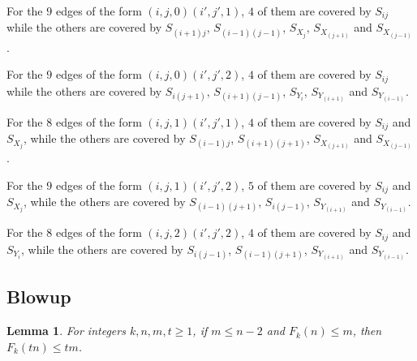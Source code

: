 \documentclass{article}
\newtheorem{lem}[thm]{Lemma}
\begin{document}
For the $9$ edges of the form $(i,j,0)(i',j',1)$, $4$ of them are covered by $S_{{ij}}$ while the others are covered by $S_{{(i+1)j}}$, $S_{{(i-1)(j-1)}}$, $S_{X_j}$, $S_{X_{(j+1)}}$ and $S_{X_{(j-1)}}$.

For the $9$ edges of the form $(i,j,0)(i',j',2)$, $4$ of them are covered by $S_{{ij}}$ while the others are covered by $S_{{i(j+1)}}$, $S_{{(i+1)(j-1)}}$, $S_{Y_i}$, $S_{Y_{(i+1)}}$ and $S_{Y_{(i-1)}}$.

For the $8$ edges of the form $(i,j,1)(i',j',1)$, $4$ of them are covered by $S_{{ij}}$ and $S_{X_j}$, while the others are covered by $S_{{(i-1)j}}$, $S_{{(i+1)(j+1)}}$, $S_{X_{(j+1)}}$ and $S_{X_{(j-1)}}$.

For the $9$ edges of the form $(i,j,1)(i',j',2)$, $5$ of them are covered by $S_{{ij}}$ and $S_{X_j}$, while the others are covered by $S_{{(i-1)(j+1)}}$, $S_{{i(j-1)}}$, $S_{Y_{(i+1)}}$ and $S_{Y_{(i-1)}}$.

For the $8$ edges of the form $(i,j,2)(i',j',2)$, $4$ of them are covered by $S_{{ij}}$ and $S_{Y_i}$, while the others are covered by $S_{{i(j-1)}}$, $S_{{(i-1)(j+1)}}$, $S_{Y_{(i+1)}}$ and $S_{Y_{(i-1)}}$.

 


\subsection{Blowup}\label{subsec:blowup}

\begin{lem}\label{lem:blowup}
For integers $k,n,m,t\ge 1$, if $m\le n-2$ and $F_k(n)\le m$, then $F_k(tn)\le tm$.
\end{lem}
\end{document}

